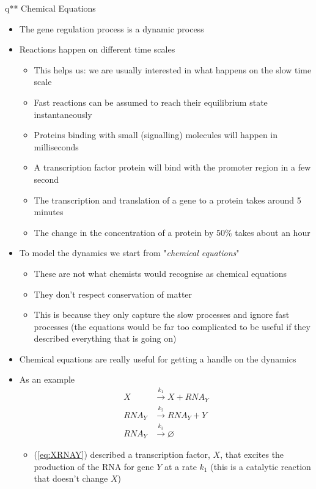 \documentclass[11pt]{article}
\newcommand{\RNA}{\mathit{RNA}}
\begin{document}
q** Chemical Equations
\begin{itemize}
\item The gene regulation process is a dynamic process
\item Reactions happen on different time scales
\begin{itemize}
\item This helps us: we are usually interested in what happens on the slow
time scale
\item Fast reactions can be assumed to reach their equilibrium state instantaneously
\item Proteins binding with small (signalling) molecules will happen
in milliseconds
\item A transcription factor protein will bind with the promoter
region in a few second
\item The transcription and translation of a gene to a protein takes
around 5 minutes
\item The change in the concentration of a protein by 50\% takes about
an hour
\end{itemize}
\item To model the dynamics we start from "\emph{chemical equations}"
\begin{itemize}
\item These are not what chemists would recognise as chemical equations
\item They don't respect conservation of matter
\item This is because they only capture the slow processes and ignore
fast processes (the equations would be far too complicated to
be useful if they described everything that is going on)
\end{itemize}
\item Chemical equations are really useful for getting a handle
on the dynamics
\item As an example
\begin{align}
 X &\stackrel{k_1}{\longrightarrow} X + \RNA_Y \label{eq:XRNAY}\\
 \RNA_Y &\stackrel{k_2}{\longrightarrow} \RNA_Y + Y \label{eq:YRNAY}\\
 \RNA_Y &\stackrel{k_3}{\longrightarrow} \varnothing \label{eq:YRNA0}
\end{align}
\begin{itemize}
\item (\ref{eq:XRNAY}) described a transcription factor, \(X\), that excites
the production of the RNA for gene \(Y\) at a rate \(k_1\) (this
is a catalytic reaction that doesn't change \(X\))

\end{itemize}
\end{itemize}
\end{document}
